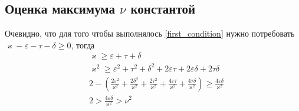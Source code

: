 \documentclass[a4paper,14pt]{extarticle} %
\begin{document}
\subsection{Оценка максимума $\nu$ константой}
Очевидно, что для того чтобы выполнялось \eqref{first_condition} нужно потребовать  $\varkappa - \varepsilon - \tau - \delta \geq 0$, тогда
\begin{equation}\label{const_ineq}
 \begin{aligned}
&\varkappa \geq \varepsilon+\tau+\delta \\
&\varkappa^2 \geq \varepsilon^2 + \tau^2 + \delta^2 + 2\varepsilon\tau + 2\varepsilon\delta + 2\tau\delta\\
&2 -(\frac{2\varepsilon^2}{\varkappa^2} + \frac{2\delta^2}{\varkappa^2} + \frac{2\tau^2}{\varkappa^2} +\frac{4\varepsilon\tau}{\varkappa^2} + \frac{4\tau\delta}{\varkappa^2}) \geq \frac{4\varepsilon\delta}{\varkappa^2}\\
&2 > \frac{4\varepsilon\delta}{\varkappa^2} > \nu^2
 \end{aligned}
\end{equation}
\end{document}
